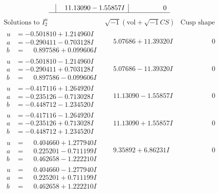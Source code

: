 \documentclass[1p]{elsarticle_modified}
\theoremstyle{definition}
\newcommand{\I}{\sqrt{-1}}
\begin{document}
$$\begin{array}{c|c|c}
 & \phantom{-}11.13090 - 1.55857 I & \phantom{-0.000000 } 0\\
 \hline 
 \end{array}$$\newpage$$\begin{array}{c|c|c}  
\text{Solutions to }I^u_{2}& \I (\text{vol} + \sqrt{-1}CS) & \text{Cusp shape}\\
 \hline 
\begin{aligned}
u &= -0.501810 + 1.214960 I \\
a &= -0.290411 - 0.703128 I \\
b &= \phantom{-}0.897586 + 0.099606 I\end{aligned}
 & \phantom{-}5.07686 + 11.39320 I & \phantom{-0.000000 } 0 \\ \hline\begin{aligned}
u &= -0.501810 - 1.214960 I \\
a &= -0.290411 + 0.703128 I \\
b &= \phantom{-}0.897586 - 0.099606 I\end{aligned}
 & \phantom{-}5.07686 - 11.39320 I & \phantom{-0.000000 } 0 \\ \hline\begin{aligned}
u &= -0.417116 + 1.264920 I \\
a &= -0.235126 - 0.713028 I \\
b &= -0.448712 - 1.234520 I\end{aligned}
 & \phantom{-}11.13090 - 1.55857 I & \phantom{-0.000000 } 0 \\ \hline\begin{aligned}
u &= -0.417116 - 1.264920 I \\
a &= -0.235126 + 0.713028 I \\
b &= -0.448712 + 1.234520 I\end{aligned}
 & \phantom{-}11.13090 + 1.55857 I & \phantom{-0.000000 } 0 \\ \hline\begin{aligned}
u &= \phantom{-}0.404660 + 1.277940 I \\
a &= \phantom{-}0.225201 - 0.711199 I \\
b &= \phantom{-}0.462658 - 1.222210 I\end{aligned}
 & \phantom{-}9.35892 + 6.86231 I & \phantom{-0.000000 } 0 \\ \hline\begin{aligned}
u &= \phantom{-}0.404660 - 1.277940 I \\
a &= \phantom{-}0.225201 + 0.711199 I \\
b &= \phantom{-}0.462658 + 1.222210 I\end{aligned}

\end{array}$$
\end{document}
